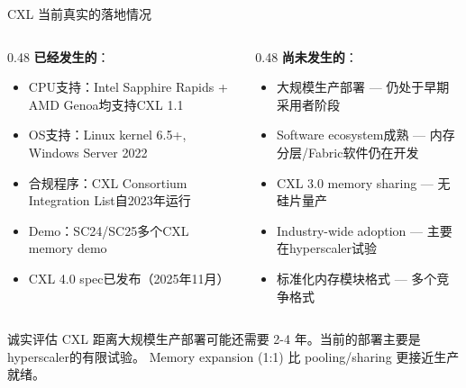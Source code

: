 \documentclass[UTF8,11pt,aspectratio=169]{beamer}
\begin{document}
\begin{frame}{CXL 当前真实的落地情况}
    \begin{columns}[T]
        \begin{column}{0.48\textwidth}
            \textbf{已经发生的}：
            \begin{itemize}
                \item CPU支持：Intel Sapphire Rapids + AMD Genoa均支持CXL 1.1
                \item OS支持：Linux kernel 6.5+, Windows Server 2022
                \item 合规程序：CXL Consortium Integration List自2023年运行
                \item Demo：SC24/SC25多个CXL memory demo
                \item CXL 4.0 spec已发布（2025年11月）
            \end{itemize}
        \end{column}
        \begin{column}{0.48\textwidth}
            \textbf{尚未发生的}：
            \begin{itemize}
                \item 大规模生产部署 — 仍处于早期采用者阶段
                \item Software ecosystem成熟 — 内存分层/Fabric软件仍在开发
                \item CXL 3.0 memory sharing — 无硅片量产
                \item Industry-wide adoption — 主要在hyperscaler试验
                \item 标准化内存模块格式 — 多个竞争格式
            \end{itemize}
        \end{column}
    \end{columns}

    \begin{alertblock}{诚实评估}
        CXL 距离大规模生产部署可能还需要 \alert{2-4 年}。当前的部署主要是hyperscaler的有限试验。
        Memory expansion (1:1) 比 pooling/sharing 更接近生产就绪。
    \end{alertblock}
\end{frame}
\end{document}
